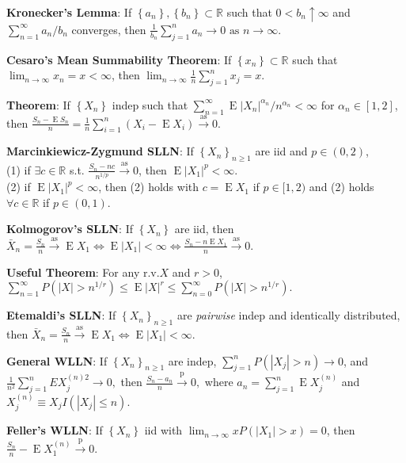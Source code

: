 \documentclass[paper=letter,fontsize=2.89mm]{scrartcl}
\DeclareMathOperator{\E}{E}
\newcommand{\convprob}{\stackrel{\text{p}}{\longrightarrow}}
\newcommand{\convas}{\stackrel{\text{as}}{\longrightarrow}}
\newcommand{\R}{\mathbb{R}}
\newcommand\abs[1]{\left| #1 \right|}
\newcommand\set[1]{\left\{ #1 \right\}}
\begin{document}
\begin{multicols*}{3}
\textbf{Kronecker's Lemma}:  If $\set{a_n}, \set{b_n} \subset \R$ such that $0<b_n \uparrow \infty$ and $\sum_{n=1}^\infty a_n/b_n$ converges, then
$ \frac{1}{b_n} \sum_{j=1}^n a_n \to 0 \text{ as } n \to \infty.$ \\ \medskip

\textbf{Cesaro's Mean Summability Theorem}: If $\set{x_n} \subset \R$ such that $\lim_{n\to\infty}x_n=x<\infty$, then 
$\lim_{n\to\infty} \frac{1}{n}\sum_{j=1}^nx_j = x.$ \\ \medskip

\textbf{Theorem}: If $\set{X_n}$ indep such that $\sum_{n=1}^\infty \E\abs{X_n}^{\alpha_n}/n^{\alpha_n} < \infty$ for $\alpha_n \in [1,2]$, then
$\frac{S_n - \E S_n}{n} = \frac{1}{n}\sum_{i=1}^n (X_i - \E X_i) \convas 0.$ \\ \medskip

\textbf{Marcinkiewicz-Zygmund SLLN}: If $\set{X_n}_{n\ge1}$ are iid and $p \in (0,2)$, \\
(1) if $\exists c \in \R$ s.t. $\frac{S_n -nc}{n^{1/p}}\convas 0$, then $\E\abs{X_1}^p < \infty$. \\
(2) if $\E\abs{X_1}^p < \infty$, then (2) holds with $c = \E X_1$ if $p \in [1,2)$ and (2) holds $\forall c\in \R$ if $p \in (0,1)$. \\ \medskip

\textbf{Kolmogorov's SLLN}: If $\set{X_n}$ are iid, then 
$\bar{X}_n = \frac{S_n}{n} \convas \E X_1 \iff \E\abs{X_1} < \infty \iff \frac{S_n - n\E X_1}{n} \convas 0.$ \\ \medskip

\textbf{Useful Theorem}: For any r.v.\@  $X$ and $r > 0$, $\sum_{n=1}^\infty P(\abs{X} > n^{1/r}) \le \E\abs{X}^r \le \sum_{n=0}^\infty P(\abs{X} > n^{1/r}).$ \\ \medskip

\textbf{Etemaldi's SLLN}: If $\set{X_n}_{n\ge1}$ are \emph{pairwise} indep and identically distributed, then 
$\bar{X}_n = \frac{S_n}{n} \convas \E X_1 \iff \E\abs{X_1} < \infty.$ \\ \medskip

\textbf{General WLLN}: If $\set{X_n}_{n\ge1}$ are indep,
$ \sum_{j=1}^n P\left(\abs{X_j} > n\right) \to 0$, and $\frac{1}{n^2} \sum_{j=1}^n E X_j^{(n)2} \to 0,$
then $\frac{S_n-a_n}{n}\convprob 0,$
where $a_n = \sum_{j=1}^n \E X_j^{(n)}$ and $X_j^{(n)} \equiv X_j I(\abs{X_j} \le n).$ \\ \medskip

\textbf{Feller's WLLN}: If $\set{X_n}$ iid with $\lim_{n\to\infty} xP(\abs{X_1}>x) = 0$, then $\frac{S_n}{n} - \E X_1^{(n)} \convprob 0.$ \\ \medskip



\end{multicols*}
\end{document}
